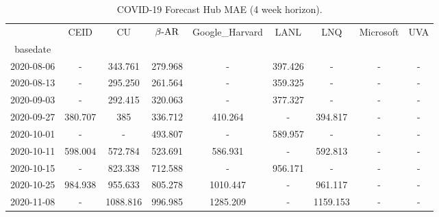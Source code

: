     
\begin{table*}[t]
\small
\caption{COVID-19 Forecast Hub MAE (4 week horizon).\label{tab:reichalb_eval_4} }

\centering
    
\begin{tabular}{ccccccccc}
\toprule
{} &     CEID &                              CU &                          $\beta\text{-AR}$ & Google\_Harvard &      LANL &       LNQ & Microsoft &                             UVA \\
basedate   &          &                                 &                                 &                 &           &           &           &                                 \\
\midrule
2020-08-06 &        - &                         343.761 &   {\cellcolor{blue!25} 279.968} &               - &   397.426 &         - &         - &                               - \\
2020-08-13 &        - &                         295.250 &   {\cellcolor{blue!25} 261.564} &               - &   359.325 &         - &         - &                               - \\
2020-09-03 &        - &   {\cellcolor{blue!25} 292.415} &                         320.063 &               - &   377.327 &         - &         - &                               - \\
2020-09-27 &  380.707 &                             385 &   {\cellcolor{blue!25} 336.712} &         410.264 &         - &   394.817 &         - &                               - \\
2020-10-01 &        - &                               - &   {\cellcolor{blue!25} 493.807} &               - &   589.957 &         - &         - &                               - \\
2020-10-11 &  598.004 &                         572.784 &   {\cellcolor{blue!25} 523.691} &         586.931 &         - &   592.813 &         - &                               - \\
2020-10-15 &        - &                         823.338 &   {\cellcolor{blue!25} 712.588} &               - &   956.171 &         - &         - &                               - \\
2020-10-25 &  984.938 &                         955.633 &   {\cellcolor{blue!25} 805.278} &        1010.447 &         - &   961.117 &         - &                               - \\
2020-11-08 &        - &                        1088.816 &   {\cellcolor{blue!25} 996.985} &        1285.209 &         - &  1159.153 &         - &                               - \\

\end{tabular}
\end{table*}
